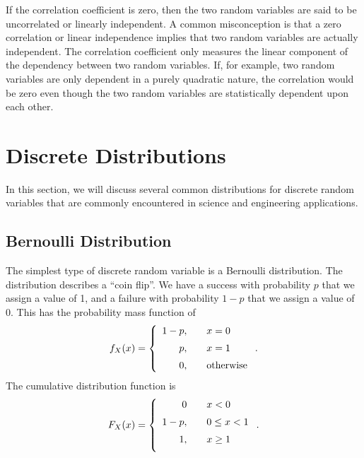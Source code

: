 If the correlation coefficient is zero, then the two random variables are said to be uncorrelated or linearly independent. A common misconception is that a zero correlation or linear independence implies that two random variables are actually independent. The correlation coefficient only measures the linear component of the dependency between two random variables. If, for example, two random variables are only dependent in a purely quadratic nature, the correlation would be zero even though the two random variables are statistically dependent upon each other.



\section{Discrete Distributions}

In this section, we will discuss several common distributions for discrete random variables that are commonly encountered in science and engineering applications.

\subsection{Bernoulli Distribution}

The simplest type of discrete random variable is a Bernoulli distribution. The distribution describes a ``coin flip''. We have a success with probability $p$ that we assign a value of 1, and a failure with probability $1 - p$ that we assign a value of 0. This has the probability mass function of
\begin{align}
  f_X(x) = \left\{ \begin{array}{r l}
  1 - p, & \quad x = 0 \vspace{0.2cm} \\
  p,     & \quad x = 1 \vspace{0.2cm} \\
  0,     & \quad \text{otherwise} \\ \end{array} \right. .
\end{align}
The cumulative distribution function is
\begin{align}
  F_X(x) = \left\{ \begin{array}{r l}
  0      & \quad x < 0 \vspace{0.2cm} \\
  1 - p, & \quad 0 \le x < 1 \vspace{0.2cm} \\
  1,     & \quad x \ge 1 \vspace{0.2cm}  \\ \end{array} \right. .
\end{align}

